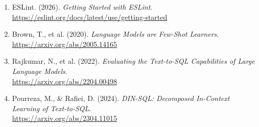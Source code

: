 \documentclass[a4paper, 12pt]{article}
\begin{document}
\begin{enumerate}
    \item ESLint. (2026). \textit{Getting Started with ESLint}. \\
    \url{https://eslint.org/docs/latest/use/getting-started}
    
    \item Brown, T., et al. (2020). \textit{Language Models are Few-Shot Learners}. \\
    \url{https://arxiv.org/abs/2005.14165}
    
    \item Rajkumar, N., et al. (2022). \textit{Evaluating the Text-to-SQL Capabilities of Large Language Models}. \\
    \url{https://arxiv.org/abs/2204.00498}
    
    \item Pourreza, M., \& Rafiei, D. (2024). \textit{DIN-SQL: Decomposed In-Context Learning of Text-to-SQL}. \\
    \url{https://arxiv.org/abs/2304.11015}
\end{enumerate}
\end{document}
